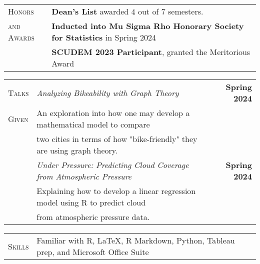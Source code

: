 \documentclass{article}
\begin{document}
\vspace{2.5mm}

\begin{tabular}{l l}
\textsc{Honors} & \textbf{Dean's List} awarded $4$ out of $7$ semesters.\\

\textsc{and Awards}	& \textbf{Inducted into Mu Sigma Rho Honorary Society for Statistics} in Spring 2024 \\
					
					& \textbf{SCUDEM 2023 Participant}, granted the Meritorious Award \\
\end{tabular}

\pagebreak

\begin{tabular}{l l r}
\textsc{Talks} & \hspace{5mm}\textit{Analyzing Bikeability with Graph Theory} & \textbf{Spring 2024}\\
\textsc{Given}			  & \hspace{10mm} An exploration into how one may develop a mathematical model to compare & \\
			  & \hspace{7.5mm} two cities in terms of how "bike-friendly" they are using graph theory. & \\
			  
			  & \hspace{5mm}\textit{Under Pressure: Predicting Cloud Coverage from Atmospheric Pressure} & \textbf{Spring 2024}\\
			  &\hspace{10mm} Explaining how to develop a linear regression model using R to predict cloud & \\
			  & \hspace{7.5mm}from atmospheric pressure data.
\end{tabular}

\hspace{2.5mm}

\begin{tabular}{l l}
\textsc{Skills} & Familiar with R, \LaTeX , R Markdown, Python, Tableau prep, and Microsoft Office Suite
\end{tabular}
\end{document}
